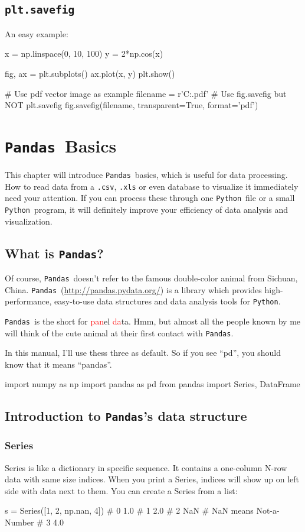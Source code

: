 \documentclass{report}
\newcommand{\pkg}[1]{\texttt{#1}}
\newcommand{\Py}{\pkg{Python}}
\newcommand{\pd}{\pkg{Pandas}}
\newcommand{\RED}[1]{\textcolor{red}{#1}}
\newcommand{\nextblock}{\vspace{2ex}}
\begin{document}
\section{\texttt{plt.savefig}}
An easy example:
\begin{py}
x = np.linspace(0, 10, 100)
y = 2*np.cos(x)

fig, ax = plt.subplots()
ax.plot(x, y)
plt.show()

# Use pdf vector image as example
filename = r'C:\test.pdf'
# Use fig.savefig but NOT plt.savefig
fig.savefig(filename, transparent=True, format='pdf')
\end{py}

\chapter{\pd\ Basics}
This chapter\cite{mckinney2012py, pandasOG} will introduce \pd\ basics, which is useful for data processing. How to read data from a \texttt{.csv}, \texttt{.xls} or even database to visualize it immediately need your attention. If you can process these through one \Py\ file or a small \Py\ program, it will definitely improve your efficiency of data analysis and visualization. 

\section{What is \pd ?}
Of course, \pd\ doesn't refer to the famous double-color animal from Sichuan, China. \pd\ (\url{http://pandas.pydata.org/}) is a library which provides high-performance, easy-to-use data structures and data analysis tools for \Py .

\pd\ is the short for \RED{pan}el \RED{da}ta. Hmm, but almost all the people known by me will think of the cute animal at their first contact with \pd . 

\nextblock In this manual, I'll use thess three as default. So if you see ``pd'', you should know that it means ``pandas''. 
\begin{py}
import numpy as np
import pandas as pd
from pandas import Series, DataFrame
\end{py}

\section{Introduction to \pd 's data structure}
\subsection{Series}
Series is like a dictionary in specific sequence. It contains a one-column N-row data with same size indices. When you print a Series, indices will show up on left side with data next to them. You can create a Series from a list: 
\begin{py}
s = Series([1, 2, np.nan, 4])
# 0    1.0
# 1    2.0
# 2    NaN # NaN means Not-a-Number
# 3    4.0
\end{py}
\end{document}
